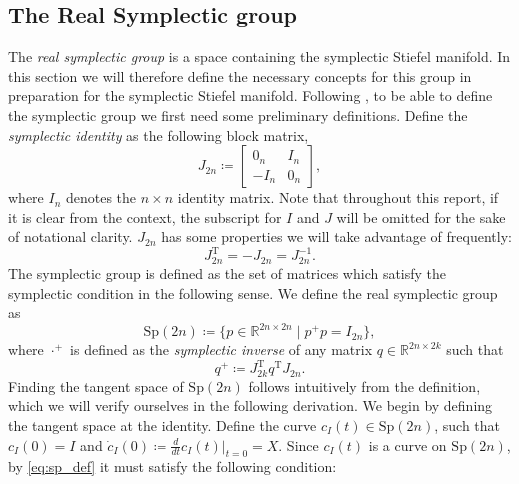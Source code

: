 \subsection{The Real Symplectic group}
The \textit{real symplectic group} is a space containing the symplectic Stiefel manifold. In this section we will therefore define the necessary concepts for this group in preparation for the symplectic Stiefel manifold. Following \cite[p.~3]{BendokatZimmermann2021}, to be able to define the symplectic group we first need some preliminary definitions. Define the \textit{symplectic identity} as the following block matrix,
\begin{equation*}
    J_{2n}\coloneqq\begin{bmatrix}
        0_{n} & I_{n} \\
        -I_{n} & 0_{n}
    \end{bmatrix},
\end{equation*}
where $I_{n}$ denotes the $n\times n$ identity matrix. Note that throughout this report, if it is clear from the context, the subscript for $I$ and $J$ will be omitted for the sake of notational clarity.  $J_{2n}$ has some properties we will take advantage of frequently:
\begin{equation}\label{eq:J_2n_properties}
    J_{2n} ^{\mathrm{T}}=-J_{2n}=J_{2n}^{-1}.
\end{equation}
The symplectic group is defined as the set of matrices which satisfy the symplectic condition in the following sense. We define the real symplectic group as %
\begin{equation}\label{eq:sp_def}
    \mathrm{Sp}(2n)\coloneqq \{p\in \mathbb{R}^{2n\times2n} \;|\; p^{+}p=I_{2n}\},
\end{equation}
where $\cdot^{+}$ is defined as the \textit{symplectic inverse} of any matrix $q\in\mathbb{R}^{2n\times2k}$ such that 
\begin{equation}\label{eq:symplectic_inverse}
    q^{+}\coloneqq J_{2k}^{\mathrm{T}}q ^{\mathrm{T}}J_{2n}.
\end{equation}
Finding the tangent space of $\mathrm{Sp}(2n)$ follows  intuitively from the definition, which we will verify ourselves in the following derivation. We begin by defining the tangent space at the identity. Define the curve $c_{I}(t)\in \mathrm{Sp}(2n)$, such that $c_{I}(0)=I$ and $\dot{c}_{I}(0)\coloneqq\tfrac{d}{dt}c_{I}(t)|_{t=0}=X$. Since $c_{I}(t)$ is a curve on $\mathrm{Sp}(2n)$, by \eqref{eq:sp_def} it must satisfy the following condition:
